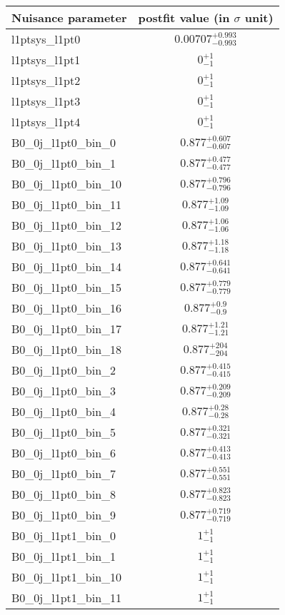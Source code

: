 
\begin{tabular}{|l|c|}
\hline
Nuisance parameter & postfit value (in $\sigma$ unit) \\\hline
l1ptsys\_l1pt0 & $0.00707^{+0.993}_{-0.993}$ \\
l1ptsys\_l1pt1 & $0^{+1}_{-1}$ \\
l1ptsys\_l1pt2 & $0^{+1}_{-1}$ \\
l1ptsys\_l1pt3 & $0^{+1}_{-1}$ \\
l1ptsys\_l1pt4 & $0^{+1}_{-1}$ \\
B0\_0j\_l1pt0\_bin\_0 & $0.877^{+0.607}_{-0.607}$ \\
B0\_0j\_l1pt0\_bin\_1 & $0.877^{+0.477}_{-0.477}$ \\
B0\_0j\_l1pt0\_bin\_10 & $0.877^{+0.796}_{-0.796}$ \\
B0\_0j\_l1pt0\_bin\_11 & $0.877^{+1.09}_{-1.09}$ \\
B0\_0j\_l1pt0\_bin\_12 & $0.877^{+1.06}_{-1.06}$ \\
B0\_0j\_l1pt0\_bin\_13 & $0.877^{+1.18}_{-1.18}$ \\
B0\_0j\_l1pt0\_bin\_14 & $0.877^{+0.641}_{-0.641}$ \\
B0\_0j\_l1pt0\_bin\_15 & $0.877^{+0.779}_{-0.779}$ \\
B0\_0j\_l1pt0\_bin\_16 & $0.877^{+0.9}_{-0.9}$ \\
B0\_0j\_l1pt0\_bin\_17 & $0.877^{+1.21}_{-1.21}$ \\
B0\_0j\_l1pt0\_bin\_18 & $0.877^{+204}_{-204}$ \\
B0\_0j\_l1pt0\_bin\_2 & $0.877^{+0.415}_{-0.415}$ \\
B0\_0j\_l1pt0\_bin\_3 & $0.877^{+0.209}_{-0.209}$ \\
B0\_0j\_l1pt0\_bin\_4 & $0.877^{+0.28}_{-0.28}$ \\
B0\_0j\_l1pt0\_bin\_5 & $0.877^{+0.321}_{-0.321}$ \\
B0\_0j\_l1pt0\_bin\_6 & $0.877^{+0.413}_{-0.413}$ \\
B0\_0j\_l1pt0\_bin\_7 & $0.877^{+0.551}_{-0.551}$ \\
B0\_0j\_l1pt0\_bin\_8 & $0.877^{+0.823}_{-0.823}$ \\
B0\_0j\_l1pt0\_bin\_9 & $0.877^{+0.719}_{-0.719}$ \\
B0\_0j\_l1pt1\_bin\_0 & $1^{+1}_{-1}$ \\
B0\_0j\_l1pt1\_bin\_1 & $1^{+1}_{-1}$ \\
B0\_0j\_l1pt1\_bin\_10 & $1^{+1}_{-1}$ \\
B0\_0j\_l1pt1\_bin\_11 & $1^{+1}_{-1}$ \\

\end{tabular}
